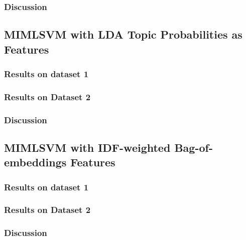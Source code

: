 \subsubsection{Discussion}

\subsection{MIMLSVM with LDA Topic Probabilities as Features}

\subsubsection{Results on dataset 1}

\subsubsection{Results on Dataset 2}

\subsubsection{Discussion}

\subsection{MIMLSVM with IDF-weighted Bag-of-embeddings Features}

\subsubsection{Results on dataset 1}

\subsubsection{Results on Dataset 2}

\subsubsection{Discussion}
